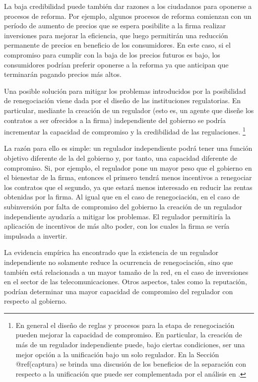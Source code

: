 \documentclass[
  12pt,
  spanish,
]{book}
\begin{document}
La baja credibilidad puede también dar razones a los ciudadanos para
oponerse a procesos de reforma. Por ejemplo, algunos procesos de reforma
comienzan con un período de aumento de precios que se espera posibilite
a la firma realizar inversiones para mejorar la eficiencia, que luego
permitirán una reducción permanente de precios en beneficio de los
consumidores. En este caso, si el compromiso para cumplir con la baja de
los precios futuros es bajo, los consumidores podrían preferir oponerse
a la reforma ya que anticipan que terminarán pagando precios más altos.

Una posible solución para mitigar los problemas introducidos por la
posibilidad de renegociación viene dada por el diseño de las
instituciones regulatorias. En particular, mediante la creación de un
regulador (esto es, un agente que diseñe los contratos a ser ofrecidos a
la firma) independiente del gobierno se podría incrementar la capacidad
de compromiso y la credibilidad de las regulaciones. \footnote{En
  general el diseño de reglas y procesos para la etapa de renegociación
  pueden mejorar la capacidad de compromiso. En particular, la creación
  de más de un regulador independiente puede, bajo ciertas condiciones,
  ser una mejor opción a la unificación bajo un solo regulador. En la
  Sección @ref(captura) se brinda una discusión de los beneficios de la
  separación con respecto a la unificación que puede ser complementada
  por el análisis en \citet{Estache1999}.}

La razón para ello es simple: un regulador independiente podrá tener una
función objetivo diferente de la del gobierno y, por tanto, una
capacidad diferente de compromiso. Si, por ejemplo, el regulador pone un
mayor peso que el gobierno en el bienestar de la firma, entonces el
primero tendrá menos incentivos a renegociar los contratos que el
segundo, ya que estará menos interesado en reducir las rentas obtenidas
por la firma. Al igual que en el caso de renegociación, en el caso de
subinversión por falta de compromiso del gobierno la creación de un
regulador independiente ayudaría a mitigar los problemas. El regulador
permitiría la aplicación de incentivos de más alto poder, con los cuales
la firma se vería impulsada a invertir.

La evidencia empírica ha encontrado que la existencia de un regulador
independiente no solamente reduce la ocurrencia de renegociación, sino
que también está relacionada a un mayor tamaño de la red, en el caso de
inversiones en el sector de las telecomunicaciones. Otros aspectos,
tales como la reputación, podrían determinar una mayor capacidad de
compromiso del regulador con respecto al gobierno.
\end{document}
